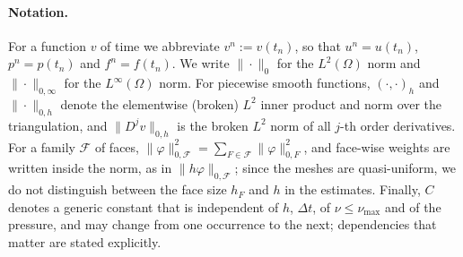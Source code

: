 \documentclass[11pt]{article}
\theoremstyle{remark}\newtheorem{remark}{Remark}
\theoremstyle{plain}
\newcommand{\new}[1]{{\color{blue}#1}}
\begin{document}
\new{\paragraph{Notation.} For a function $v$ of time we abbreviate $v^n:=v(t_n)$, so that $u^n=u(t_n)$, $p^n=p(t_n)$ and $f^n=f(t_n)$. We write $\|\cdot\|_0$ for the $L^2(\Omega)$ norm and $\|\cdot\|_{0,\infty}$ for the $L^\infty(\Omega)$ norm. For piecewise smooth functions, $(\cdot,\cdot)_h$ and $\|\cdot\|_{0,h}$ denote the elementwise (broken) $L^2$ inner product and norm over the triangulation, and $\|D^jv\|_{0,h}$ is the broken $L^2$ norm of all $j$-th order derivatives. For a family $\mathcal F$ of faces, $\|\varphi\|_{0,\mathcal F}^2=\sum_{F\in\mathcal F}\|\varphi\|_{0,F}^2$, and face-wise weights are written inside the norm, as in $\|h\varphi\|_{0,\mathcal F}$; since the meshes are quasi-uniform, we do not distinguish between the face size $h_F$ and $h$ in the estimates. Finally, $C$ denotes a generic constant that is independent of $h$, $\Delta t$, of $\nu\le\nu_{\max}$ and of the pressure, and may change from one occurrence to the next; dependencies that matter are stated explicitly.}
\end{document}
